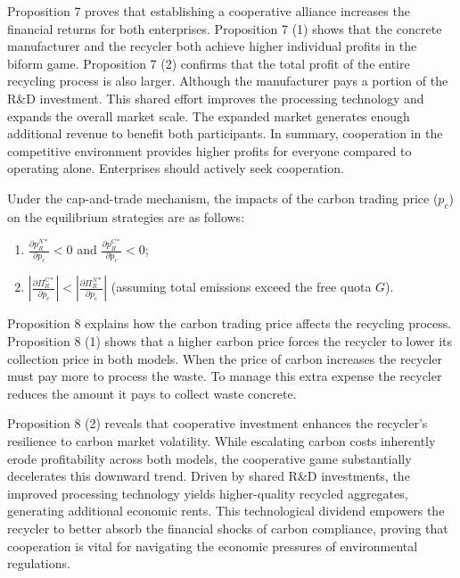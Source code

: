 \documentclass[authoryear,preprint,review,times,10pt]{elsarticle}
\begin{document}
Proposition 7 proves that establishing a cooperative alliance increases the financial returns for both enterprises. Proposition 7 (1) shows that the concrete manufacturer and the recycler both achieve higher individual profits in the biform game. Proposition 7 (2) confirms that the total profit of the entire recycling process is also larger. Although the manufacturer pays a portion of the R\&D investment. This shared effort improves the processing technology and expands the overall market scale. The expanded market generates enough additional revenue to benefit both participants. In summary, cooperation in the competitive environment provides higher profits for everyone compared to operating alone. Enterprises should actively seek cooperation.


\begin{prop}
\label{prop:carbon_impact}
Under the cap-and-trade mechanism, the impacts of the carbon trading price ($p_{c}$) on the equilibrium strategies are as follows:
\begin{enumerate}[label={(\arabic*)}]
\item $\frac{\partial p_{R}^{N*}}{\partial p_{c}} < 0$ and $\frac{\partial p_{R}^{C*}}{\partial p_{c}} < 0$;
\item $|\frac{\partial \Pi_{R}^{C*}}{\partial p_{c}}| < |\frac{\partial \Pi_{R}^{N*}}{\partial p_{c}}|$ (assuming total emissions exceed the free quota $G$).
\end{enumerate}
\end{prop}

Proposition 8 explains how the carbon trading price affects the recycling process. Proposition 8 (1) shows that a higher carbon price forces the recycler to lower its collection price in both models. When the price of carbon increases the recycler must pay more to process the waste. To manage this extra expense the recycler reduces the amount it pays to collect waste concrete.

Proposition 8 (2) reveals that cooperative investment enhances the recycler's resilience to carbon market volatility. While escalating carbon costs inherently erode profitability across both models, the cooperative game substantially decelerates this downward trend. Driven by shared R\&D investments, the improved processing technology yields higher-quality recycled aggregates, generating additional economic rents. This technological dividend empowers the recycler to better absorb the financial shocks of carbon compliance, proving that cooperation is vital for navigating the economic pressures of environmental regulations.
\end{document}
